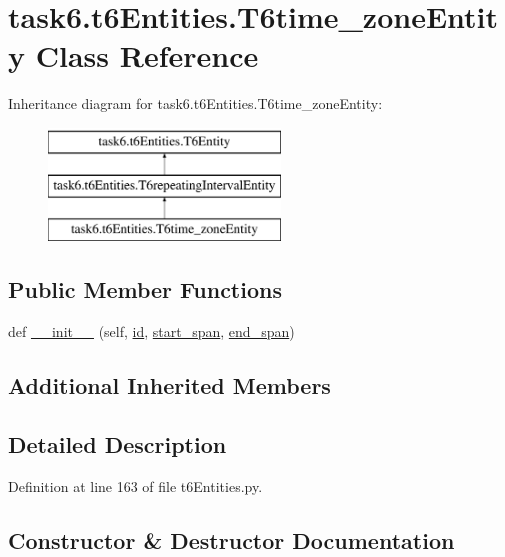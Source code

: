 \hypertarget{classtask6_1_1t6Entities_1_1T6time__zoneEntity}{}\section{task6.\+t6\+Entities.\+T6time\+\_\+zone\+Entity Class Reference}
\label{classtask6_1_1t6Entities_1_1T6time__zoneEntity}
Inheritance diagram for task6.\+t6\+Entities.\+T6time\+\_\+zone\+Entity\+:\begin{figure}[H]
\begin{center}
\leavevmode
\includegraphics[height=3.000000cm]{classtask6_1_1t6Entities_1_1T6time__zoneEntity}
\end{center}
\end{figure}
\subsection*{Public Member Functions}
\begin{DoxyCompactItemize}
\item 
def \hyperlink{classtask6_1_1t6Entities_1_1T6time__zoneEntity_aa43177bdf1b06659195cf9a7cc3eaf85}{\+\_\+\+\_\+init\+\_\+\+\_\+} (self, \hyperlink{classtask6_1_1t6Entities_1_1T6Entity_afeeced8134bb3ebe0cfecc64d0ab46a4}{id}, \hyperlink{classtask6_1_1t6Entities_1_1T6Entity_a52779e9af8864dc98e8b02fc5b9b041a}{start\+\_\+span}, \hyperlink{classtask6_1_1t6Entities_1_1T6Entity_aeb402200b156cd9562c5111dfe777b98}{end\+\_\+span})
\end{DoxyCompactItemize}
\subsection*{Additional Inherited Members}


\subsection{Detailed Description}


Definition at line 163 of file t6\+Entities.\+py.



\subsection{Constructor \& Destructor Documentation}
\mbox{\label{classtask6_1_1t6Entities_1_1T6time__zoneEntity_aa43177bdf1b06659195cf9a7cc3eaf85}} 
